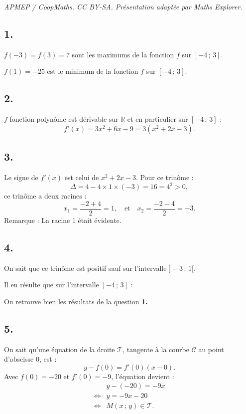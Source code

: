 \documentclass[10pt]{article}
\begin{document}
\noindent\textit{APMEP / CoopMaths. CC BY-SA. Présentation adaptée par Maths Explorer.}\par\medskip
\subsection*{1.}

\(f(-3) = f(3) = 7\) sont les maximums de la fonction \(f\) sur \([-4\,;\,3]\).

\(f(1) = -25 \) est le minimum de la fonction \(f\) sur \([-4\,;\,3]\).

\subsection*{2.}

\(f\) fonction polynôme est dérivable sur \(\mathbb{R}\) et en particulier sur \([-4\,;\,3]\) :
\[
f'(x) = 3x^2 + 6x - 9 = 3(x^2 + 2x - 3).
\]

\subsection*{3.}

Le signe de \( f'(x) \) est celui de \( x^2 + 2x - 3 \). Pour ce trinôme :
\[
\Delta = 4 - 4 \times 1 \times (-3) = 16 = 4^2 > 0,
\]
ce trinôme a deux racines :
\[
x_1 = \frac{-2 + 4}{2} = 1, \quad \text{et} \quad x_2 = \frac{-2 - 4}{2} = -3.
\]
Remarque : La racine 1 était évidente.

\subsection*{4.}

On sait que ce trinôme est positif sauf sur l'intervalle \( ]-3\,;\,1[ \).

Il en résulte que sur l'intervalle \([-4\,;\,3]\) :
\begin{center}
\end{center}
On retrouve bien les résultats de la question \textbf{1.}

\subsection*{5.}

On sait qu'une équation de la droite \( \mathcal{T} \), tangente à la courbe \( \mathcal{C} \) au point d'abscisse 0, est :
\[
y - f(0) = f'(0)(x - 0).
\]
Avec \( f(0) = -20 \) et \( f'(0) = -9 \), l'équation devient :
\begin{align*}
&y - (-20) = -9x \\
\iff &y = -9x - 20 \\
\iff &M(x\,;\,y) \in \mathcal{T}.
\end{align*}
\end{document}
